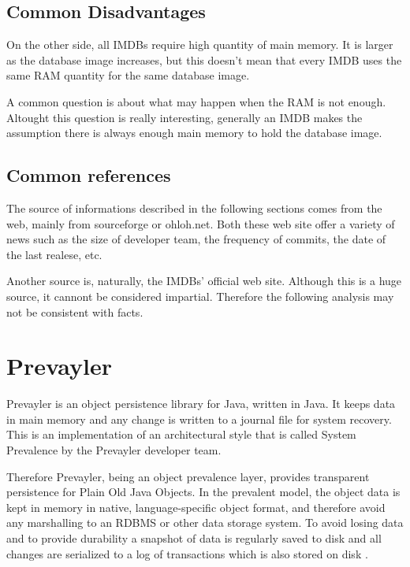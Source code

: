 	\subsection{Common Disadvantages}
	On the other side, all IMDBs require high quantity of main memory. It is larger as the database image increases, 
	but this doesn't mean that every IMDB uses the same RAM quantity for the same database image. 
	
	A common question 
	is about what may happen when the RAM is not enough. Altought this question is really interesting, generally 
	an IMDB makes the assumption there is always enough main memory to hold the database image.
	
	\subsection{Common references}
	The source of informations described in the following sections comes from the web, 
	mainly from sourceforge or 
	ohloh.net. Both these web site offer a variety of news such as the size of developer team, the frequency of 
	commits, the date of the last realese, etc. 
	
	Another source is, naturally, the IMDBs' official web site. Although this is a huge source, it 
	cannont be considered impartial. Therefore the following analysis may not be consistent with facts. 
		
		\section{Prevayler}		
		Prevayler is an object persistence library for Java, written in Java. 
		It keeps data in main memory and any change is written to a journal file for system recovery. This is 
		an implementation of an architectural style that is called System Prevalence by the 
		Prevayler developer team. 
		
		Therefore Prevayler, being an object prevalence layer, provides transparent persistence for 
		Plain Old Java Objects. In the prevalent model, the object data is kept in memory in native, language-specific 
		object format, and therefore avoid any marshalling to an RDBMS or other data storage system. 
		To avoid losing data and to provide durability a snapshot of data is regularly saved to disk and all changes 
		are serialized to a log of transactions which is also stored on disk \cite{Wuestefeld}.
		
